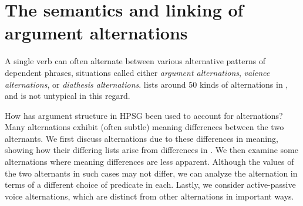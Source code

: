 \documentclass[output=paper
 	        ,biblatex
                ,babelshorthands
                ,newtxmath
                ,draftmode
                ,colorlinks, citecolor=brown
]{langscibook}
\begin{document}
\section{The semantics and linking of argument alternations}
\label{alternations}
A single verb can often alternate between
 various alternative patterns of dependent phrases, situations called either 
\emph{argument alternations},
\emph{valence alternations}, or \emph{diathesis alternations}.
\citet{Levin1993} lists around 50 kinds of alternations in , and  is not untypical in this regard.

%

How has argument structure in HPSG been used to account for alternations?
Many alternations exhibit (often subtle) meaning differences between the two 
alternants.
We first discuss alternations due to these differences in meaning, showing how their differing \argst lists arise from differences in .  
We then examine some alternations where meaning differences are less apparent.
Although the  values of the two alternants in such cases may not differ, we can analyze the alternation in terms of a different choice of  predicate in each.
Lastly, we consider active-passive voice alternations, which are distinct from other alternations in important ways.
\end{document}
